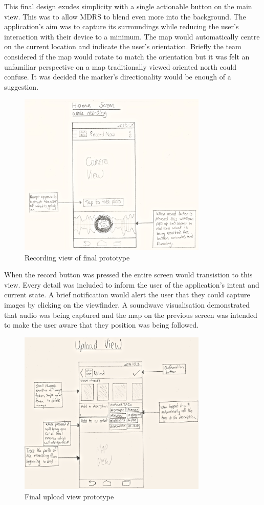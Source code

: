 \documentclass{l3proj}
\begin{document}
This final design exudes simplicity with a single actionable button on the main view. This was to allow MDRS to blend even more into the background. The application's aim was to capture its surroundings while reducing the user's interaction with their device to a minimum. The map would automatically centre on the current location and indicate the user's orientation. Briefly the team considered if the map would rotate to match the orientation but it was felt an unfamiliar perspective on a map traditionally viewed oriented north could confuse. It was decided the marker's directionality would be enough of a suggestion.

\begin{figure}[ht!]
\centering
\includegraphics[width=90mm]{images/android-recording-view.jpg}
\caption{Recording view of final prototype}
\label{overflow}
\end{figure}

When the record button was pressed the entire screen would transistion to this view. Every detail was included to inform the user of the application's intent and current state. A brief notification would alert the user that they could capture images by clicking on the viewfinder. A soundwave visualisation demonstrated that audio was being captured and the map on the previous screen was intended to make the user aware that they position was being followed.

\begin{figure}[ht!]
\centering
\includegraphics[width=90mm]{images/android-upload-view.jpg}
\caption{Final upload view prototype}
\label{overflow}
\end{figure}
\end{document}
